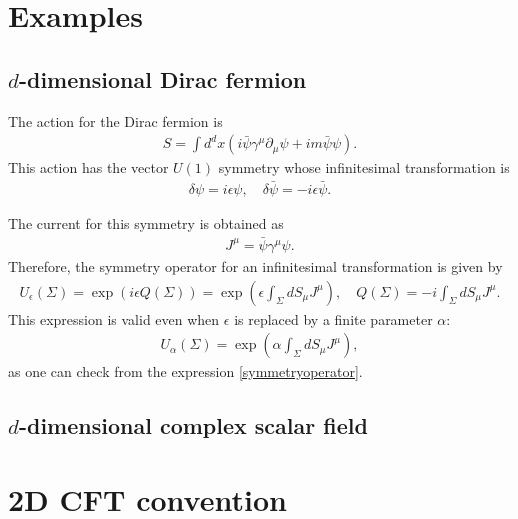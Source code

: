 \documentclass[12pt]{scrartcl}
\newcommand{\del}{\partial}
\newcommand{\psib}{\bar{\psi}}
\begin{document}
\section{Examples}
\subsection{$d$-dimensional Dirac fermion}
The action for the Dirac fermion is
\begin{align}
    S=\int d^d x \left(i \psib \gamma^{\mu}\del_{\mu}\psi+im \psib\psi\right).
\end{align}
This action has the vector $U(1)$ symmetry whose infinitesimal transformation is
\begin{align}
    \delta\psi=i\epsilon\psi,\quad 
    \delta\psib=-i\epsilon\psib.
\end{align}

The current for this symmetry is obtained as
\begin{align}
    J^{\mu}=\psib \gamma^{\mu} \psi.
\end{align}
Therefore, the symmetry operator for an infinitesimal transformation is given by
\begin{align}
    U_{\epsilon}(\Sigma)=\exp\left(
        i\epsilon Q(\Sigma)
    \right)=\exp\left(
        \epsilon\int_{\Sigma}dS_{\mu}J^{\mu}
    \right),\quad
    Q(\Sigma)=-i\int_{\Sigma}dS_{\mu}J^{\mu}.
\end{align}
This expression is valid even when $\epsilon$ is replaced by a finite parameter $\alpha$:
\begin{align}
    U_{\alpha}(\Sigma)=\exp\left(
        \alpha\int_{\Sigma}dS_{\mu}J^{\mu}
    \right),
\end{align}
as one can check from the expression 
\eqref{symmetryoperator}.


\subsection{$d$-dimensional complex scalar field}


\section{2D CFT convention}


\appendix
\end{document}
